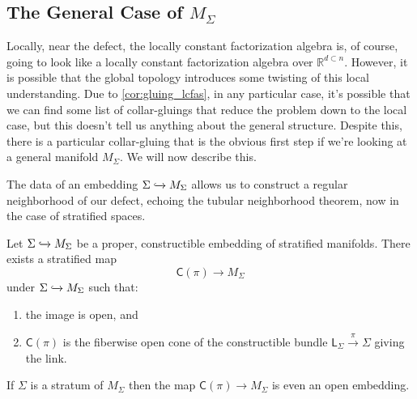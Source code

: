 \documentclass[../text]{subfiles}
\begin{document}
\subsection{The General Case of \texorpdfstring{$M_{\Sigma}$}{M Sigma}}

Locally, near the defect, the locally constant factorization algebra is, of course, going to look like a locally constant factorization algebra over $\mathbb{R}^{d \subset n}$. However, it is possible that the global topology introduces some twisting of this local understanding. Due to \cref{cor:gluing_lcfas}, in any particular case, it's possible that we can find some list of collar-gluings that reduce the problem down to the local case, but this doesn't tell us anything about the general structure. Despite this, there is a particular collar-gluing that is the obvious first step if we're looking at a general manifold $M_\Sigma$. We will now describe this.

The data of an embedding $\Sigma \xhookrightarrow{} M_\Sigma$ allows us to construct a regular neighborhood of our defect, echoing the tubular neighborhood theorem, now in the case of stratified spaces.
%
\begin{theorem}
    Let $\Sigma \xhookrightarrow{} M_\Sigma$ be a proper, constructible embedding of stratified manifolds. There exists a stratified map
    \begin{equation}
        \mathsf{C}(\pi) \rightarrow M_\Sigma
    \end{equation}
    under $\Sigma \xhookrightarrow{} M_\Sigma$ such that:
    \begin{enumerate}
        \item the image is open, and
        \item $\mathsf{C}(\pi)$ is the fiberwise open cone of the constructible bundle $\mathsf{L}_{\Sigma} \xrightarrow{\pi} \Sigma$ giving the link.
    \end{enumerate}
    If $\Sigma$ is a stratum of $M_\Sigma$ then the map $\mathsf{C}(\pi) \rightarrow M_\Sigma$ is even an open embedding.
\end{theorem}
\end{document}
